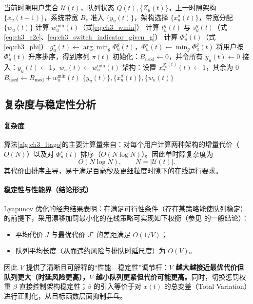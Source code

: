 \documentclass[type=master]{fduthesis}
\begin{document}
\begin{algorithm}[t]
\caption{L-TAGO：Lyapunov 引导的在线贪心资源编排}
\label{alg:ch3_ltago}
\begin{algorithmic}[1]
\Require 当前时隙用户集合 $\mathcal{U}(t)$，队列状态 $Q(t),\{Z_u(t)\}$，上一时隙架构 $\{x_u(t-1)\}$，系统带宽 $B_s$
\Ensure 准入 $\{y_u(t)\}$，架构选择 $\{x_u^g(t)\}$，带宽分配 $\{w_u(t)\}$
  \State 计算 $w_u^{\min}(t)$（式\eqref{eq:ch3_wmin}）
     \State 计算 $t_u^g(t)$ 与 $s_u^g(t)$（式\eqref{eq:ch3_e2e}、\eqref{eq:ch3_switch_indicator_given_g}）
     \State 计算 $\Phi_u^g(t)$（式\eqref{eq:ch3_phi}）
  \EndFor
  \State $g_u^\star(t)\gets \arg\min_g \Phi_u^g(t)$，$\Phi_u^\star(t)\gets \min_g \Phi_u^g(t)$
\EndFor
\State 将用户按 $\Phi_u^\star(t)$ 升序排序，得到序列 $\pi(t)$
\State 初始化：$B_{\mathrm{used}}\gets 0$，并令所有 $y_u(t)\gets 0$
     \State 接入：$y_u(t)\gets 1$，$w_u(t)\gets w_u^{\min}(t)$
     \State 架构：设置 $x_u^{g_u^\star(t)}(t)\gets 1$，其余为 0
     \State $B_{\mathrm{used}}\gets B_{\mathrm{used}}+w_u^{\min}(t)$
  \EndIf
\EndFor
\State \Return $\{y_u(t)\},\{x_u^g(t)\},\{w_u(t)\}$
\end{algorithmic}
\end{algorithm}

\subsection{复杂度与稳定性分析}
\label{subsec:ch3_analysis}

\paragraph{复杂度}
算法\ref{alg:ch3_ltago}的主要计算量来自：对每个用户计算两种架构的增量代价（$O(N)$）以及对 $\Phi_u^\star(t)$ 排序（$O(N\log N)$）。因此单时隙复杂度为
\begin{equation}
O(N\log N),\qquad N=|\mathcal{U}(t)|.
\end{equation}
其代价由排序主导，易于满足百毫秒及更细粒度时隙下的在线运行要求。

\paragraph{稳定性与性能界（结论形式）}
Lyapunov 优化的经典结果表明：在满足可行性条件（存在某策略能使队列稳定）的前提下，采用漂移加罚最小化的在线策略可实现如下权衡（参见 \cite{neely2010stochastic} 的一般结论）：
\begin{itemize}
  \item 平均代价 $\overline{J}$ 与最优代价 $J^\star$ 的差距满足 $O(1/V)$；
  \item 队列平均长度（从而违约风险与排队时延尺度）为 $O(V)$。
\end{itemize}
因此 $V$ 提供了清晰且可解释的“性能—稳定性”调节杆：\textbf{$V$ 越大越接近最优代价但队列更大（时延风险更高），$V$ 越小队列更紧但代价可能更高。}同时，切换惩罚权重 $\beta$ 直接控制架构稳定性；$\beta$ 的引入等价于对 $x(t)$ 的总变差（Total Variation）进行正则化，从目标函数层面抑制乒乓。
\end{document}
